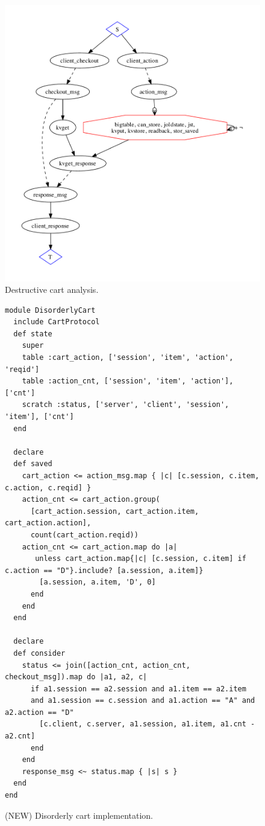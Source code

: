 \begin{figure}[t]
\centering
\includegraphics[width=0.7\linewidth]{fig/destructive_kvs.pdf}
\vspace{-10pt}
\caption{Destructive cart analysis.}
\label{fig:pdg-destructive-kvs-analysis}
\vspace{-2pt}
\end{figure}



\begin{figure}[t]
\begin{scriptsize}
\begin{lstlisting}
module DisorderlyCart
  include CartProtocol
  def state
    super
    table :cart_action, ['session', 'item', 'action', 'reqid']
    table :action_cnt, ['session', 'item', 'action'], ['cnt']
    scratch :status, ['server', 'client', 'session', 'item'], ['cnt']
  end

  declare
  def saved
    cart_action <= action_msg.map { |c| [c.session, c.item, c.action, c.reqid] }
    action_cnt <= cart_action.group(
      [cart_action.session, cart_action.item, cart_action.action],
      count(cart_action.reqid))
    action_cnt <= cart_action.map do |a|
       unless cart_action.map{|c| [c.session, c.item] if c.action == "D"}.include? [a.session, a.item]}
        [a.session, a.item, 'D', 0]
      end
    end
  end

  declare
  def consider
    status <= join([action_cnt, action_cnt, checkout_msg]).map do |a1, a2, c|
      if a1.session == a2.session and a1.item == a2.item
      and a1.session == c.session and a1.action == "A" and a2.action == "D"
        [c.client, c.server, a1.session, a1.item, a1.cnt - a2.cnt]
      end
    end
    response_msg <~ status.map { |s| s }
  end
end

\end{lstlisting}
\vspace{-10pt}
\caption{(NEW) Disorderly cart implementation.}
\label{fig:dis_cart}
\end{scriptsize}
\vspace{-2pt}
\end{figure}




